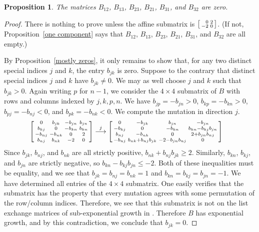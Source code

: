\documentclass{amsart}
\newtheorem{proposition}{Proposition}[section]
\theoremstyle{definition}
\theoremstyle{remark}
\numberwithin{equation}{section}
\newcommand{\0}{{\mathbf{0}}}
\begin{document}
\begin{proposition}\label{really zero}
The matrices $B_{12}$, $B_{13}$, $B_{23}$, $B_{21}$, $B_{31}$, and $B_{32}$ are zero.
\end{proposition}
\begin{proof}
There is nothing to prove unless the affine submatrix is $\begin{bsmallmatrix*}[r]0&2\\-2&0\end{bsmallmatrix*}$.
(If not, Proposition~\ref{one component} says that $B_{12}$, $B_{13}$, $B_{23}$, $B_{21}$, $B_{31}$, and $B_{32}$ are all empty.)

By Proposition~\ref{mostly zeros}, it only remains to show that, for any two distinct special indices $j$ and $k$, the entry $b_{jk}$ is zero.
Suppose to the contrary that distinct special indices $j$ and $k$ have $b_{jk}\neq0$.
We may as well choose $j$ and $k$ such that $b_{jk}>0$.
Again writing $p$ for $n-1$, we consider the $4\times4$ submatrix of $B$ with rows and columns indexed by $j,k,p,n$.
We have $b_{jp}=-b_{jn}>0$, $b_{kp}=-b_{kn}>0$, $b_{pj}=-b_{nj}<0$, and $b_{pk}=-b_{nk}<0$.
We compute the mutation in direction $j$.
\begin{align*}
\begin{bsmallmatrix*}
0&b_{jk}&-b_{jn}&b_{jn}\\
b_{kj}&0&-b_{kn}&b_{kn}\\
-b_{nj}&-b_{nk}&0&2\\
b_{nj}&b_{nk}&-2&0
\end{bsmallmatrix*}
&\overset{j}{\longrightarrow}
\begin{bsmallmatrix*}
0&-b_{jk}&b_{jn}&-b_{jn}\\
-b_{kj}&0&-b_{kn}&b_{kn}-b_{kj}b_{jn}\\
b_{nj}&-b_{nk}&0&2+b_{jn}b_{nj}\\
-b_{nj}&b_{nk}+b_{nj}b_{jk}&-2-b_{jn}b_{nj}&0
\end{bsmallmatrix*}
\end{align*}
Since $b_{jk}$, $b_{nj}$, and $b_{nk}$ are all strictly positive, $b_{nk}+b_{nj}b_{jk}\ge2$.
Similarly, $b_{kn}$, $b_{kj}$, and $b_{jn}$ are strictly negative, so $b_{kn}-b_{kj}b_{jn}\le-2$.
Both of these inequalities must be equality, and we see that $b_{jk}=b_{nj}=b_{nk}=1$ and $b_{kn}=b_{kj}=b_{jn}=-1$.
We have determined all entries of the $4\times 4$ submatrix.
One easily verifies that the submatrix has the property that every mutation agrees with some permutation of the row/column indices.  
Therefore, we see that this submatrix is not on the list exchange matrices of sub-exponential growth in \cite[Theorem~1.1]{FeShThTu12}.
Therefore $B$ has exponential growth, and by this contradiction, we conclude that $b_{jk}=0$.
\end{proof}
\end{document}
